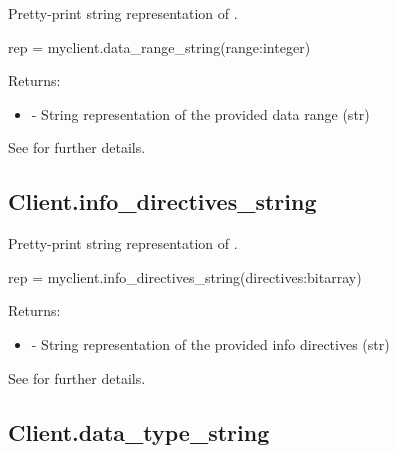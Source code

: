 \summary

Pretty-print string representation of .

\format

\pyspecificstart
\begin{codepar}
rep = myclient.data_range_string(range:integer)
\end{codepar}
\pyspecificend

\begin{arglist}
\end{arglist}

Returns:
\begin{itemize}
    \item {} - String representation of the provided data range (str)
\end{itemize}

See  for further details.


\subsection{Client.info_directives_string}

\summary

Pretty-print string representation of .

\format

\pyspecificstart
\begin{codepar}
rep = myclient.info_directives_string(directives:bitarray)
\end{codepar}
\pyspecificend

\begin{arglist}
\end{arglist}

Returns:
\begin{itemize}
    \item {} - String representation of the provided info directives (str)
\end{itemize}

See  for further details.


\subsection{Client.data_type_string}

